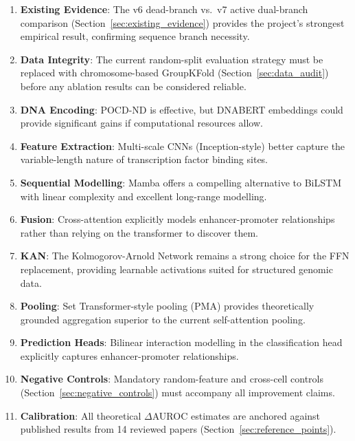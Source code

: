 \documentclass[11pt,a4paper]{article}
\begin{document}
\begin{enumerate}
    \item \textbf{Existing Evidence}: The v6 dead-branch vs.\ v7 active dual-branch comparison (Section~\ref{sec:existing_evidence}) provides the project's strongest empirical result, confirming sequence branch necessity.
    
    \item \textbf{Data Integrity}: The current random-split evaluation strategy must be replaced with chromosome-based GroupKFold (Section~\ref{sec:data_audit}) before any ablation results can be considered reliable.
    
    \item \textbf{DNA Encoding}: POCD-ND is effective, but DNABERT embeddings could provide significant gains if computational resources allow.
    
    \item \textbf{Feature Extraction}: Multi-scale CNNs (Inception-style) better capture the variable-length nature of transcription factor binding sites.
    
    \item \textbf{Sequential Modelling}: Mamba offers a compelling alternative to BiLSTM with linear complexity and excellent long-range modelling.
    
    \item \textbf{Fusion}: Cross-attention explicitly models enhancer-promoter relationships rather than relying on the transformer to discover them.
    
    \item \textbf{KAN}: The Kolmogorov-Arnold Network remains a strong choice for the FFN replacement, providing learnable activations suited for structured genomic data.
    
    \item \textbf{Pooling}: Set Transformer-style pooling (PMA) provides theoretically grounded aggregation superior to the current self-attention pooling.
    
    \item \textbf{Prediction Heads}: Bilinear interaction modelling in the classification head explicitly captures enhancer-promoter relationships.
    
    \item \textbf{Negative Controls}: Mandatory random-feature and cross-cell controls (Section~\ref{sec:negative_controls}) must accompany all improvement claims.
    
    \item \textbf{Calibration}: All theoretical $\Delta$AUROC estimates are anchored against published results from 14 reviewed papers (Section~\ref{sec:reference_points}).
\end{enumerate}
\end{document}
